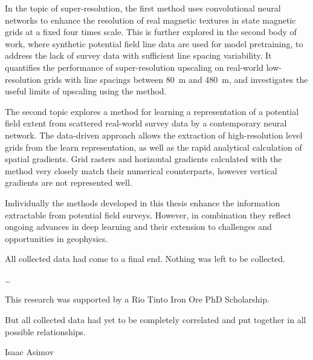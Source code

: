 \documentclass[12pt,a4paper]{report} %
\begin{document}
In the topic of super-resolution, the first method uses convolutional neural networks to enhance the resolution of real magnetic textures in state magnetic grids at a fixed four times scale.
This is further explored in the second body of work, where synthetic potential field line data are used for model pretraining, to address the lack of survey data with sufficient line spacing variability.
It quantifies the performance of super-resolution upscaling on real-world low-resolution grids with line spacings between \SI{80}{\m} and \SI{480}{\m}, and investigates the useful limits of upscaling using the method.

The second topic explores a method for learning a representation of a potential field extent from scattered real-world survey data by a contemporary neural network.
The data-driven approach allows the extraction of high-resolution level grids from the learn representation, as well as the rapid analytical calculation of spatial gradients.
Grid rasters and horizontal gradients calculated with the method very closely match their numerical counterparts, however vertical gradients are not represented well.

Individually the methods developed in this thesis enhance the information extractable from potential field surveys.
However, in combination they reflect ongoing advances in deep learning and their extension to challenges and opportunities in geophysics.

\vfill{}
\epigraph{All collected data had come to a final end. Nothing was left to be collected.}{}

\newpage{}
\dots{}

This research was supported by a Rio Tinto Iron Ore PhD Scholarship.

\vfill{}
\epigraph{But all collected data had yet to be completely correlated and put together in all possible relationships.}{Isaac Asimov}

\newpage{}
\tableofcontents{}
\end{document}
